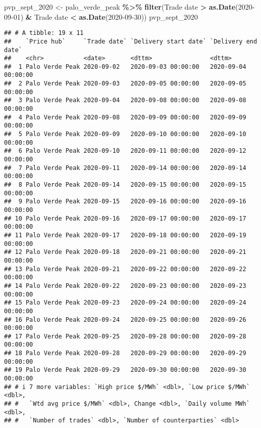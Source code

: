 \documentclass[
]{article}
\newenvironment{Shaded}{\begin{snugshade}}{\end{snugshade}}
\newcommand{\AttributeTok}[1]{\textcolor[rgb]{0.13,0.29,0.53}{#1}}
\newcommand{\FunctionTok}[1]{\textcolor[rgb]{0.13,0.29,0.53}{\textbf{#1}}}
\newcommand{\NormalTok}[1]{#1}
\newcommand{\OtherTok}[1]{\textcolor[rgb]{0.56,0.35,0.01}{#1}}
\newcommand{\SpecialCharTok}[1]{\textcolor[rgb]{0.81,0.36,0.00}{\textbf{#1}}}
\newcommand{\StringTok}[1]{\textcolor[rgb]{0.31,0.60,0.02}{#1}}
\begin{document}
\begin{Shaded}
\begin{Highlighting}[]
\NormalTok{pvp\_sept\_2020 }\OtherTok{\textless{}{-}}\NormalTok{ palo\_verde\_peak }\SpecialCharTok{\%\textgreater{}\%}
  \FunctionTok{filter}\NormalTok{(}\StringTok{\textasciigrave{}}\AttributeTok{Trade date}\StringTok{\textasciigrave{}} \SpecialCharTok{\textgreater{}} \FunctionTok{as.Date}\NormalTok{(}\StringTok{\textquotesingle{}2020{-}09{-}01\textquotesingle{}}\NormalTok{) }\SpecialCharTok{\&} \StringTok{\textasciigrave{}}\AttributeTok{Trade date}\StringTok{\textasciigrave{}} \SpecialCharTok{\textless{}} \FunctionTok{as.Date}\NormalTok{(}\StringTok{\textquotesingle{}2020{-}09{-}30\textquotesingle{}}\NormalTok{))}
\NormalTok{pvp\_sept\_2020}
\end{Highlighting}
\end{Shaded}

\begin{verbatim}
## # A tibble: 19 x 11
##    `Price hub`     `Trade date` `Delivery start date` `Delivery end date`
##    <chr>           <date>       <dttm>                <dttm>             
##  1 Palo Verde Peak 2020-09-02   2020-09-03 00:00:00   2020-09-04 00:00:00
##  2 Palo Verde Peak 2020-09-03   2020-09-05 00:00:00   2020-09-05 00:00:00
##  3 Palo Verde Peak 2020-09-04   2020-09-08 00:00:00   2020-09-08 00:00:00
##  4 Palo Verde Peak 2020-09-08   2020-09-09 00:00:00   2020-09-09 00:00:00
##  5 Palo Verde Peak 2020-09-09   2020-09-10 00:00:00   2020-09-10 00:00:00
##  6 Palo Verde Peak 2020-09-10   2020-09-11 00:00:00   2020-09-12 00:00:00
##  7 Palo Verde Peak 2020-09-11   2020-09-14 00:00:00   2020-09-14 00:00:00
##  8 Palo Verde Peak 2020-09-14   2020-09-15 00:00:00   2020-09-15 00:00:00
##  9 Palo Verde Peak 2020-09-15   2020-09-16 00:00:00   2020-09-16 00:00:00
## 10 Palo Verde Peak 2020-09-16   2020-09-17 00:00:00   2020-09-17 00:00:00
## 11 Palo Verde Peak 2020-09-17   2020-09-18 00:00:00   2020-09-19 00:00:00
## 12 Palo Verde Peak 2020-09-18   2020-09-21 00:00:00   2020-09-21 00:00:00
## 13 Palo Verde Peak 2020-09-21   2020-09-22 00:00:00   2020-09-22 00:00:00
## 14 Palo Verde Peak 2020-09-22   2020-09-23 00:00:00   2020-09-23 00:00:00
## 15 Palo Verde Peak 2020-09-23   2020-09-24 00:00:00   2020-09-24 00:00:00
## 16 Palo Verde Peak 2020-09-24   2020-09-25 00:00:00   2020-09-26 00:00:00
## 17 Palo Verde Peak 2020-09-25   2020-09-28 00:00:00   2020-09-28 00:00:00
## 18 Palo Verde Peak 2020-09-28   2020-09-29 00:00:00   2020-09-29 00:00:00
## 19 Palo Verde Peak 2020-09-29   2020-09-30 00:00:00   2020-09-30 00:00:00
## # i 7 more variables: `High price $/MWh` <dbl>, `Low price $/MWh` <dbl>,
## #   `Wtd avg price $/MWh` <dbl>, Change <dbl>, `Daily volume MWh` <dbl>,
## #   `Number of trades` <dbl>, `Number of counterparties` <dbl>
\end{verbatim}
\end{document}
